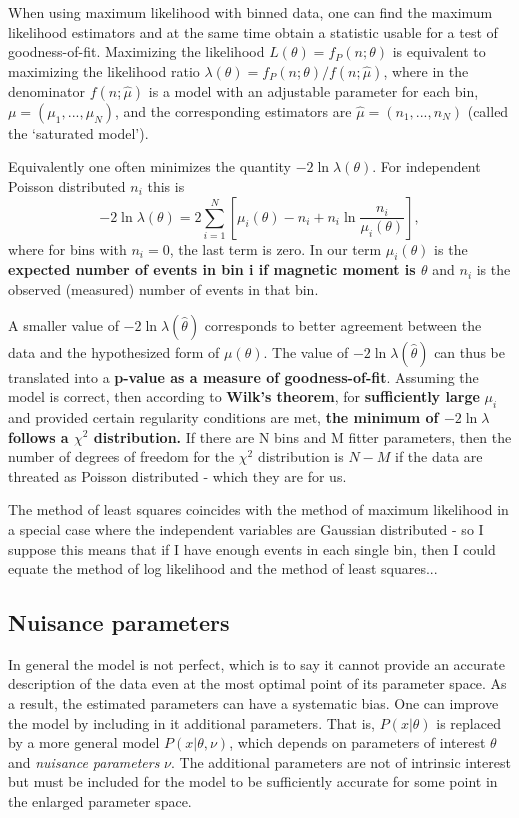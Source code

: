 When using maximum likelihood with binned data, one can find the maximum likelihood estimators and at the same time obtain a statistic usable for a test of goodness-of-fit. Maximizing the likelihood $L\left(\theta\right)=f_P\left(n;\theta\right)$ is equivalent to maximizing the likelihood ratio $\lambda\left(\theta\right)=f_P\left(n;\theta\right) / f\left(n;\hat{\mu}\right)$, where in the denominator $f\left(n;\hat{\mu}\right)$ is a model with an adjustable parameter for each bin, $\mu=\left(\mu_1,...,\mu_N\right)$, and the corresponding estimators are $\hat{\mu}=\left(n_1,...,n_N\right)$ (called the `saturated model').

Equivalently one often minimizes the quantity $-2\ln\lambda\left(\theta\right)$. For independent Poisson distributed $n_i$ this is
\begin{equation}
-2\ln\lambda\left(\theta\right)=2\sum_{i=1}^{N}\left[\mu_i\left(\theta\right)-n_i+n_i\ln\frac{n_i}{\mu_i\left(\theta\right)}\right],
\end{equation}
where for bins with $n_i=0$, the last term is zero. In our term $\mu_i\left(\theta\right)$ is the \textbf{expected number of events in bin i if magnetic moment is $\theta$} and $n_i$ is the observed (measured) number of events in that bin.

A smaller value of $-2\ln\lambda\left(\hat{\theta}\right)$ corresponds to better agreement between the data and the hypothesized form of $\mu\left(\theta\right)$. The value of $-2\ln\lambda\left(\hat{\theta}\right)$ can thus be translated into a \textbf{p-value as a measure of goodness-of-fit}. Assuming the model is correct, then according to \textbf{Wilk's theorem}, for \textbf{sufficiently large} $\mu_i$ and provided certain regularity conditions are met, \textbf{the minimum of $-2\ln\lambda$ follows a $\chi^2$ distribution.} If there are N bins and M fitter parameters, then the number of degrees of freedom for the $\chi^2$ distribution is $N-M$ if the data are threated as Poisson distributed - which they are for us.

The method of least squares coincides with the method of maximum likelihood in a special case where the independent variables are Gaussian distributed - so I suppose this means that if I have enough events in each single bin, then I could equate the method of log likelihood and the method of least squares...

\subsection{Nuisance parameters}
In general the model is not perfect, which is to say it cannot provide an accurate description of the data even at the most optimal point of its parameter space. As a result, the estimated parameters can have a systematic bias. One can improve the model by including in it additional parameters. That is, $P\left(x|\theta\right)$ is replaced by a more general model $P\left(x|\theta,\nu\right)$, which depends on parameters of interest $\theta$ and \textit{nuisance parameters} $\nu$. The additional parameters are not of intrinsic interest but must be included for the model to be sufficiently accurate for some point in the enlarged parameter space.

